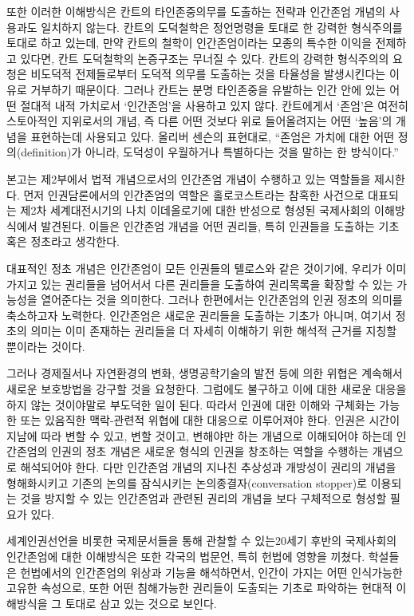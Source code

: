 또한 이러한 이해방식은 칸트의 타인존중의무를 도출하는 전략과 인간존엄 개념의 사용과도 일치하지 않는다. 칸트의 도덕철학은 정언명령을 토대로 한 강력한 형식주의를 토대로 하고 있는데, 만약 칸트의 철학이 인간존엄이라는 모종의 특수한 이익을 전제하고 있다면, 칸트 도덕철학의 논증구조는 무너질 수 있다. 칸트의 강력한 형식주의의 요청은 비도덕적 전제들로부터 도덕적 의무를 도출하는 것을 타율성을 발생시킨다는 이유로 거부하기 때문이다. 그러나 칸트는 분명 타인존중을 유발하는 인간 안에 있는 어떤 절대적 내적 가치로서 `인간존엄'을 사용하고 있지 않다. 칸트에게서 `존엄'은 여전히 스토아적인 지위로서의 개념, 즉 다른 어떤 것보다 위로 들어올려지는 어떤 `높음'의 개념을 표현하는데 사용되고 있다. 올리버 센슨의 표현대로, ``존엄은 가치에 대한 어떤 정의(definition)가 아니라, 도덕성이 우월하거나 특별하다는 것을 말하는 한 방식이다.''

본고는 제2부에서 법적 개념으로서의 인간존엄 개념이 수행하고 있는 역할들을 제시한다. 먼저 인권담론에서의 인간존엄의 역할은 홀로코스트라는 참혹한 사건으로 대표되는 제2차 세계대전시기의 나치 이데올로기에 대한 반성으로 형성된 국제사회의 이해방식에서 발견된다. 이들은 인간존엄 개념을 어떤 권리들, 특히 인권들을 도출하는 기초 혹은 정초라고 생각한다.

대표적인 정초 개념은 인간존엄이 모든 인권들의 텔로스와 같은 것이기에, 우리가 이미 가지고 있는 권리들을 넘어서서 다른 권리들을 도출하여 권리목록을 확장할 수 있는 가능성을 열어준다는 것을 의미한다. 그러나 한편에서는 인간존엄의 인권 정초의 의미를 축소하고자 노력한다. 인간존엄은 새로운 권리들을 도출하는 기초가 아니며, 여기서 정초의 의미는 이미 존재하는 권리들을 더 자세히 이해하기 위한 해석적 근거를 지칭할 뿐이라는 것이다.

그러나 경제질서나 자연환경의 변화, 생명공학기술의 발전 등에 의한 위협은 계속해서 새로운 보호방법을 강구할 것을 요청한다. 그럼에도 불구하고 이에 대한 새로운 대응을 하지 않는 것이야말로 부도덕한 일이 된다. 따라서 인권에 대한 이해와 구체화는 가능한 또는 있음직한 맥락-관련적 위협에 대한 대응으로 이루어져야 한다. 인권은 시간이 지남에 따라 변할 수 있고, 변할 것이고, 변해야만 하는 개념으로 이해되어야 하는데 인간존엄의 인권의 정초 개념은 새로운 형식의 인권을 창조하는 역할을 수행하는 개념으로 해석되어야 한다. 다만 인간존엄 개념의 지나친 추상성과 개방성이 권리의 개념을 형해화시키고 기존의 논의를 잠식시키는 논의종결자(conversation stopper)로 이용되는 것을 방지할 수 있는 인간존엄과 관련된 권리의 개념을 보다 구체적으로 형성할 필요가 있다.

세계인권선언을 비롯한 국제문서들을 통해 관찰할 수 있는20세기 후반의 국제사회의 인간존엄에 대한 이해방식은 또한 각국의 법문언, 특히 헌법에 영향을 끼쳤다. 학설들은 헌법에서의 인간존엄의 위상과 기능을 해석하면서, 인간이 가지는 어떤 인식가능한 고유한 속성으로, 또한 어떤 침해가능한 권리들이 도출되는 기초로 파악하는 현대적 이해방식을 그 토대로 삼고 있는 것으로 보인다.


